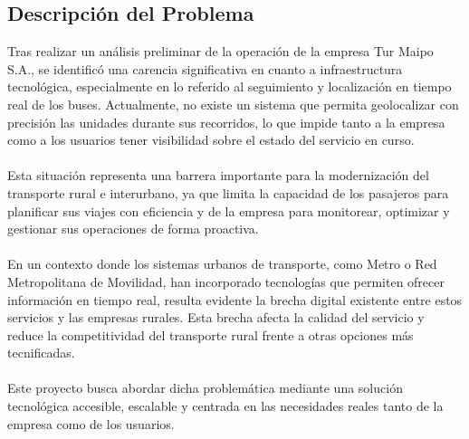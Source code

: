 \documentclass[12pt]{article}
\begin{document}
\subsection{Descripción del Problema}
Tras realizar un análisis preliminar de la operación de la empresa Tur Maipo S.A., se identificó una carencia significativa en cuanto a infraestructura tecnológica, especialmente en lo referido al seguimiento y localización en tiempo real de los buses. Actualmente, no existe un sistema que permita geolocalizar con precisión las unidades durante sus recorridos, lo que impide tanto a la empresa como a los usuarios tener visibilidad sobre el estado del servicio en curso.
\\\\
Esta situación representa una barrera importante para la modernización del transporte rural e interurbano, ya que limita la capacidad de los pasajeros para planificar sus viajes con eficiencia y de la empresa para monitorear, optimizar y gestionar sus operaciones de forma proactiva.
\\\\
En un contexto donde los sistemas urbanos de transporte, como Metro o Red Metropolitana de Movilidad, han incorporado tecnologías que permiten ofrecer información en tiempo real, resulta evidente la brecha digital existente entre estos servicios y las empresas rurales. Esta brecha afecta la calidad del servicio y reduce la competitividad del transporte rural frente a otras opciones más tecnificadas.
\\\\
Este proyecto busca abordar dicha problemática mediante una solución tecnológica accesible, escalable y centrada en las necesidades reales tanto de la empresa como de los usuarios.
\newpage
\end{document}
